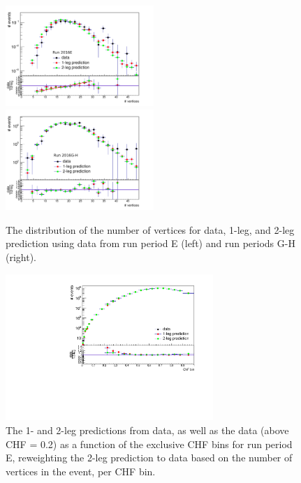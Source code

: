 \begin{figure}[ht]
  \centering
  \includegraphics[width=0.5\textwidth]{figures/Data_distributions_excl_RunE_ChF0p25To0p3_nvtx.pdf}\hfill%
  \includegraphics[width=0.5\textwidth]{figures/RunGH_ChF0p25To0p3_nvtx.pdf}
  \caption{The distribution of the number of vertices for data, 1-leg, and 2-leg prediction using data from run period E (left) and run periods G-H (right).}
  \label{fig:nvtx_reweighting}
\end{figure}

\begin{figure}[ht]
  \centering
  \includegraphics[width=0.7\textwidth]{figures/data_vs_prediction_RunE_reweighted_exclusivebinning.pdf}\hfill%
  \caption{The 1- and 2-leg predictions from data, as well as the data (above CHF = 0.2) as a function of the exclusive CHF bins for run period E, reweighting the 2-leg prediction to data based on the number of vertices in the event, per CHF bin.}
  \label{fig:BF_reweighted}
\end{figure}

